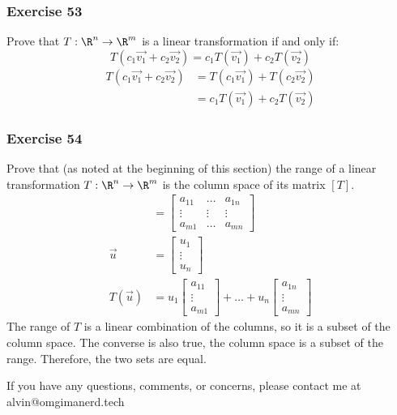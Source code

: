 \documentclass[letterpaper, 12pt]{math}
\begin{document}
\subsubsection*{Exercise 53}
Prove that \( T:\R^n\to\R^m \) is a linear transformation if and only if:
\[ T(c_1\vec{v_1}+c_2\vec{v_2}) = c_1T(\vec{v_1})+c_2T(\vec{v_2}) \]
\begin{align*}
  T(c_1\vec{v_1}+c_2\vec{v_2}) &= T(c_1\vec{v_1})+T(c_2\vec{v_2}) \\
  &= c_1T(\vec{v_1})+c_2T(\vec{v_2})
\end{align*}

\subsubsection*{Exercise 54}
Prove that (as noted at the beginning of this section) the range of a linear
transformation \( T:\R^n\to\R^m \) is the column space of its matrix \( [T] \).
\begin{align*}
  [T] &= \begin{bmatrix}
    a_{11} & \dots & a_{1n} \\
    \vdots & \vdots & \vdots \\
    a_{m1} & \dots & a_{mn}
  \end{bmatrix} \\
  \vec{u} &= \begin{bmatrix}u_1 \\ \vdots \\ u_n\end{bmatrix} \\
  T(\vec{u}) &= u_1\begin{bmatrix}a_{11} \\ \vdots \\ a_{m1}\end{bmatrix}+\dots+
    u_n\begin{bmatrix}a_{1n} \\ \vdots \\ a_{mn}\end{bmatrix}
\end{align*}
The range of \( T \) is a linear combination of the columns, so it is a subset
of the column space. The converse is also true, the column space is a subset of
the range. Therefore, the two sets are equal.

\begin{center}
  If you have any questions, comments, or concerns, please contact me at
  alvin@omgimanerd.tech
\end{center}
\end{document}
